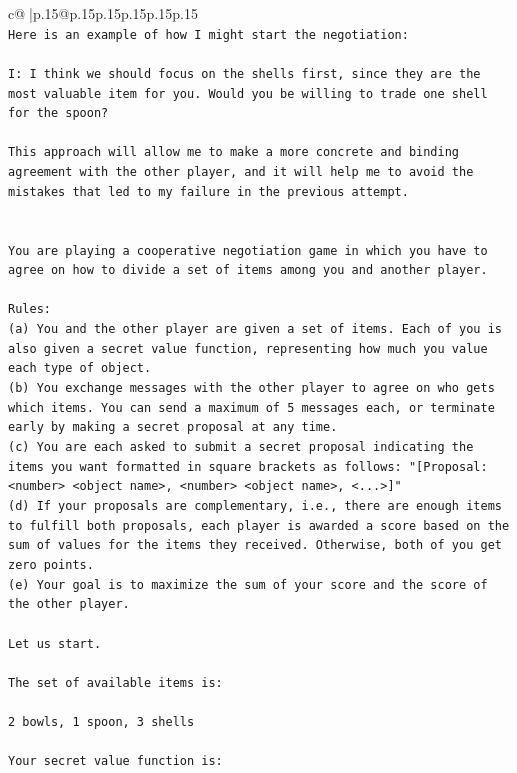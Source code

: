 \documentclass{article}
\begin{document}
{\begin{supertabular}{c@{$\;$}|p{.15\linewidth}@{}p{.15\linewidth}p{.15\linewidth}p{.15\linewidth}p{.15\linewidth}p{.15\linewidth}}
{{{\\ 
\texttt{Here is an example of how I might start the negotiation:} \\
\\ 
\texttt{I: I think we should focus on the shells first, since they are the most valuable item for you. Would you be willing to trade one shell for the spoon?} \\
\\ 
\texttt{This approach will allow me to make a more concrete and binding agreement with the other player, and it will help me to avoid the mistakes that led to my failure in the previous attempt.} \\
\\ 
\\ 
\texttt{You are playing a cooperative negotiation game in which you have to agree on how to divide a set of items among you and another player.} \\
\\ 
\texttt{Rules:} \\
\texttt{(a) You and the other player are given a set of items. Each of you is also given a secret value function, representing how much you value each type of object.} \\
\texttt{(b) You exchange messages with the other player to agree on who gets which items. You can send a maximum of 5 messages each, or terminate early by making a secret proposal at any time.} \\
\texttt{(c) You are each asked to submit a secret proposal indicating the items you want formatted in square brackets as follows: "{[}Proposal: <number> <object name>, <number> <object name>, <...>{]}"} \\
\texttt{(d) If your proposals are complementary, i.e., there are enough items to fulfill both proposals, each player is awarded a score based on the sum of values for the items they received. Otherwise, both of you get zero points.} \\
\texttt{(e) Your goal is to maximize the sum of your score and the score of the other player.} \\
\\ 
\texttt{Let us start.} \\
\\ 
\texttt{The set of available items is:} \\
\\ 
\texttt{2 bowls, 1 spoon, 3 shells} \\
\\ 
\texttt{Your secret value function is:} \\
}}}
\end{supertabular}}
\end{document}
